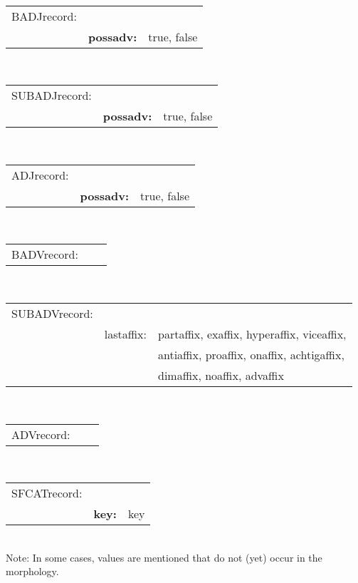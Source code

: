 \\
\begin{tabular}{lll}
BADJrecord: &                     &              \\
            & {\bf possadv:}      & true, false  \\
\end{tabular}
\\
\begin{tabular}{lll}
SUBADJrecord: &                   &              \\
              & {\bf possadv:}    & true, false  \\
\end{tabular}
\\
\begin{tabular}{lll}
ADJrecord: &                      &              \\
              & {\bf possadv:}    & true, false  \\
\end{tabular}
\\
\begin{tabular}{lll}
BADVrecord: &                     &              \\
\end{tabular}
\\
\begin{tabular}{lll}
SUBADVrecord: &                   &              \\
               & lastaffix:     & partaffix, exaffix, hyperaffix, viceaffix,\\
               &                & antiaffix, proaffix, onaffix, achtigaffix,\\
               &                & dimaffix,  noaffix, advaffix  \\
\end{tabular}
\\
\begin{tabular}{lll}
ADVrecord: &                      &              \\
\end{tabular}
\\
\begin{tabular}{lll}
SFCATrecord: &                 &              \\
             & {\bf key:}      & key     \\
\end{tabular}
\\

Note: In some cases, values are mentioned that do not (yet) 
      occur in the morphology.

